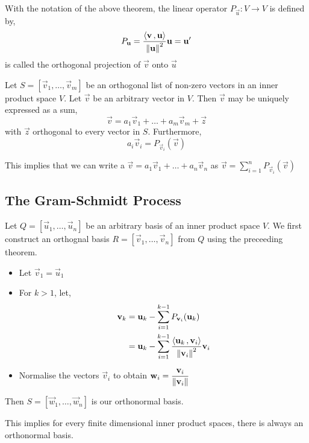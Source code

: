 \documentclass{article}
\begin{document}
\begin{ndefi}
  With the notation of the above theorem, the linear operator $P_{\vec u} : V \to V$ is defined by,
  $$ P_{\boldsymbol{\mathbf{u}}} = \frac{\left\langle \boldsymbol{\mathbf{v}}\,, \boldsymbol{\mathbf{u}} \right\rangle}{\left\lVert \boldsymbol{\mathbf{u}}\right\rVert^2}\boldsymbol{\mathbf{u}} = \boldsymbol{\mathbf{u}}'$$
  is called the orthogonal projection of $\vec v$ onto $\vec u$
\end{ndefi}

\begin{nthm}
  Let $S = [\vec v_1, \dots, \vec v_m]$ be an orthogonal list of non-zero vectors in an inner product space $V$. Let $\vec v$ be an arbitrary vector in $V$. Then $\vec v$ may be uniquely expressed as a sum,
  $$ \vec v = a_1\vec v_1 + \dots + a_m\vec v_m + \vec z $$
  with $\vec z$ orthogonal to every vector in $S$. Furthermore,
  $$ a_i\vec v_i = P_{\vec v_i}({\vec v}) $$
\end{nthm}

\begin{remark}
  This implies that we can write a $\vec v = a_1\vec v_1 + \dots + a_n\vec v_n$ as $\displaystyle{\vec v = \sum_{i=1}^n {P_{\vec v_i}(\vec v)}}$
\end{remark}

\subsection{The Gram-Schmidt Process}

Let $Q = [\vec u_1, \dots, \vec u_n]$ be an arbitrary basis of an inner product space $V$. We first construct an orthognal basis $R = [\vec v_1, \dots, \vec v_n]$ from $Q$ using the preceeding theorem.
\begin{itemize}
  \item Let $\vec v_1 = \vec u_1$
  \item For $k > 1$, let,
  \begin{align*}
    \boldsymbol{\mathbf{v}}_k &= \boldsymbol{\mathbf{u}}_k - \sum_{i=1}^{k-1}{P_{\boldsymbol{\mathbf{v}}_i}({\boldsymbol{\mathbf{u}}_k})}\\
    &= \boldsymbol{\mathbf{u}}_k - \sum_{i=1}^{k - 1} { \frac{\left\langle \boldsymbol{\mathbf{u}}_k\,, \boldsymbol{\mathbf{v}}_i \right\rangle}{\left\lVert \boldsymbol{\mathbf{v}}_i\right\rVert^2}\boldsymbol{\mathbf{v}}_i}
  \end{align*}
  \item Normalise the vectors $\vec v_i$ to obtain $\displaystyle{\boldsymbol{\mathbf{w}}_i = \frac{\boldsymbol{\mathbf{v}}_i}{\left\lVert \boldsymbol{\mathbf{v}}_i\right\rVert}}$
\end{itemize}
Then $S = [\vec w_1, \dots, \vec w_n]$ is our orthonormal basis.

\begin{remark}
  This implies for every finite dimensional inner product spaces, there is always an orthonormal basis.
\end{remark}
\end{document}
